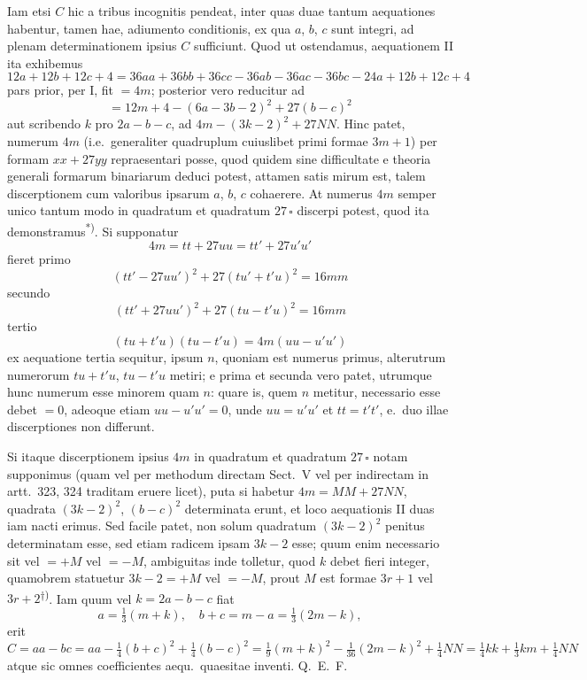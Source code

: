 \documentclass[12pt,a4paper]{article}
\theoremstyle{plain}
\theoremstyle{definition}
\theoremstyle{remark}
\begin{document}
Iam etsi $C$ hic a tribus incognitis pendeat, inter quas duae tantum aequationes habentur, tamen hae, adiumento conditionis, ex qua $a$, $b$, $c$ sunt integri, ad plenam determinationem ipsius $C$ sufficiunt. Quod ut ostendamus, aequationem II ita exhibemus
\[12a + 12b + 12c + 4 = 36aa + 36bb + 36cc - 36ab - 36ac - 36bc - 24a + 12b + 12c + 4\]
pars prior, per I, fit $= 4m$; posterior vero reducitur ad
\[= 12m + 4 - (6a - 3b - 2)^2 + 27(b - c)^2\]
aut scribendo $k$ pro $2a - b - c$, ad $4m - (3k - 2)^2 + 27NN$. Hinc patet, numerum $4m$ (i.e.\ generaliter quadruplum cuiuslibet primi formae $3m+1$) per formam $xx + 27yy$ repraesentari posse, quod quidem sine difficultate e theoria generali formarum binariarum deduci potest, attamen satis mirum est, talem discerptionem cum valoribus ipsarum $a$, $b$, $c$ cohaerere. At numerus $4m$ semper unico tantum modo in quadratum et quadratum $27\,\square$ discerpi potest, quod ita demonstramus\textsuperscript{*)}. Si supponatur
\[4m = tt + 27uu = tt' + 27u'u'\]
fieret primo
\[(tt' - 27uu')^2 + 27(tu' + t'u)^2 = 16mm\]
secundo
\[(tt' + 27uu')^2 + 27(tu - t'u)^2 = 16mm\]
tertio
\[(tu + t'u)(tu - t'u) = 4m(uu - u'u')\]
ex aequatione tertia sequitur, ipsum $n$, quoniam est numerus primus, alterutrum numerorum $tu + t'u$, $tu - t'u$ metiri; e prima et secunda vero patet, utrumque hunc numerum esse minorem quam $n$: quare is, quem $n$ metitur, necessario esse debet $= 0$, adeoque etiam $uu - u'u' = 0$, unde $uu = u'u'$ et $tt = t't'$, e.\ duo illae discerptiones non differunt.

Si itaque discerptionem ipsius $4m$ in quadratum et quadratum $27\,\square$ notam supponimus (quam vel per methodum directam Sect.\ V vel per indirectam in artt.\ 323, 324 traditam eruere licet), puta si habetur $4m = MM + 27NN$, quadrata $(3k - 2)^2$, $(b - c)^2$ determinata erunt, et loco aequationis II duas iam nacti erimus. Sed facile patet, non solum quadratum $(3k - 2)^2$ penitus determinatam esse, sed etiam radicem ipsam $3k - 2$ esse; quum enim necessario sit vel $= +M$ vel $= -M$, ambiguitas inde tolletur, quod $k$ debet fieri integer, quamobrem statuetur $3k - 2 = +M$ vel $= -M$, prout $M$ est formae $3r+1$ vel $3r+2$\textsuperscript{$\dagger$)}. Iam quum vel $k = 2a - b - c$ fiat
\[a = \tfrac{1}{3}(m + k), \quad b + c = m - a = \tfrac{1}{3}(2m - k),\]
erit
\[C = aa - bc = aa - \tfrac{1}{4}(b+c)^2 + \tfrac{1}{4}(b-c)^2 = \tfrac{1}{9}(m+k)^2 - \tfrac{1}{36}(2m-k)^2 + \tfrac{1}{4}NN = \tfrac{1}{4}kk + \tfrac{1}{3}km + \tfrac{1}{4}NN\]
atque sic omnes coefficientes aequ.\ quaesitae inventi. \hfill Q.\ E.\ F.
\end{document}
